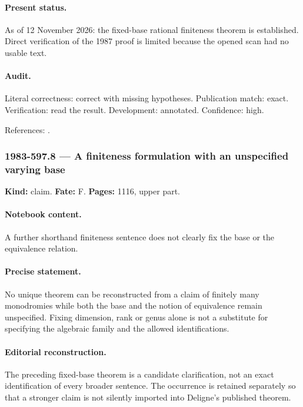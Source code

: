 \paragraph{Present status.} As of 12 November 2026: the fixed-base rational finiteness theorem is established. Direct verification of the 1987 proof is limited because the opened scan had no usable text.

\paragraph{Audit.} Literal correctness: correct with missing hypotheses. Publication match: exact. Verification: read the result. Development: annotated. Confidence: high.

\noindent References: \citep{deligne1987finitude,achinger2018monodromy}.\par

\subsubsection{1983-597.8 --- A finiteness formulation with an unspecified varying base}

\label{item:1983-597.8}

\noindent\textbf{Kind:} claim. \textbf{Fate:} F. \textbf{Pages:} 1116, upper part.\par

\paragraph{Notebook content.} A further shorthand finiteness sentence does not clearly fix the base or the equivalence relation.

\paragraph{Precise statement.} No unique theorem can be reconstructed from a claim of finitely many monodromies while both the base and the notion of equivalence remain unspecified. Fixing dimension, rank or genus alone is not a substitute for specifying the algebraic family and the allowed identifications.

\paragraph{Editorial reconstruction.} The preceding fixed-base theorem is a candidate clarification, not an exact identification of every broader sentence. The occurrence is retained separately so that a stronger claim is not silently imported into Deligne's published theorem.

